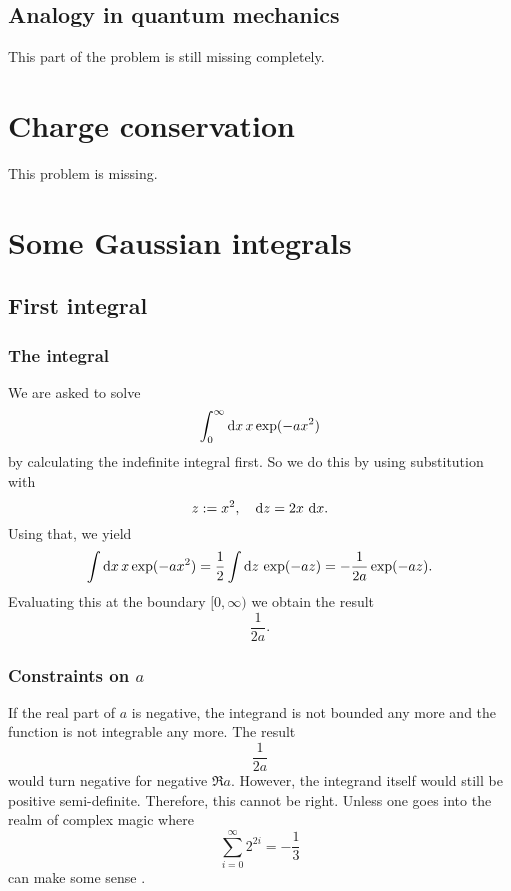 \documentclass[11pt, english, fleqn, DIV=15, headinclude, BCOR=1cm]{scrartcl}
\begin{document}
\subsection{Analogy in quantum mechanics}

\begin{warning}
    This part of the problem is still missing completely.
\end{warning}

\section{Charge conservation} %

\begin{warning}
    This problem is missing.
\end{warning}

\section{Some Gaussian integrals} %

\subsection{First integral}

\subsubsection{The integral}

We are asked to solve
\[
    \int_0^\infty \mathop{}\!\mathrm d x \, x \exp(-ax^2)
\]
by calculating the indefinite integral first. So we do this by using
substitution with
\[
    z := x^2
    ,\quad
    \mathop{}\!\mathrm d z = 2 x \, \mathop{}\!\mathrm d x.
\]
Using that, we yield
\[
    \int \mathop{}\!\mathrm d x \, x \exp(-ax^2) = \frac{1}{2} \int \mathop{}\!\mathrm d z \, \exp(-az) = -
    \frac{1}{2a} \exp(-az).
\]
Evaluating this at the boundary $[0, \infty)$ we obtain the result
\[
    \frac{1}{2a}.
\]

\subsubsection{Constraints on $a$}

If the real part of $a$ is negative, the integrand is not bounded any more and
the function is not integrable any more. The result
\[
    \frac{1}{2a}
\]
would turn negative for negative $\Re a$. However, the integrand itself would
still be positive semi-definite. Therefore, this cannot be right. Unless one
goes into the realm of complex magic where
\[
    \sum_{i = 0}^\infty 2^{2i} = - \frac{1}{3}
\]
can make some sense \parencite[78]{penrose-road_to_reality}.
\end{document}
